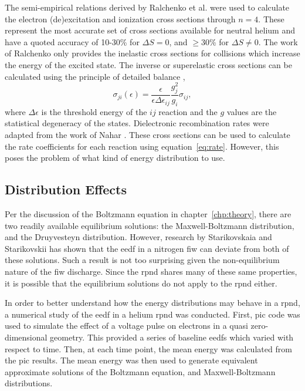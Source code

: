 The semi-empirical relations derived by Ralchenko et al. \cite{Ralchenko2008}
were used to calculate the electron (de)excitation and ionization cross sections
through $n=4$. These represent the most accurate set of cross sections available
for neutral helium and have a quoted accuracy of 10-30\% for $\Delta S=0$, and
$\ge30$\% for $\Delta S \neq 0$. The work of Ralchenko only provides the
inelastic cross sections for collisions which increase the energy of the excited
state. The inverse or superelastic cross sections can be calculated using the
principle of detailed balance \cite{Kunze2009},
\begin{equation}
  \sigma_{ji}(\epsilon) = \frac{\epsilon}{\epsilon\Delta\epsilon_{ij}}
    \frac{g_j^2}{g_i}\sigma_{ij},
\end{equation}
where $\Delta\epsilon$ is the threshold energy of the $ij$ reaction and the $g$
values are the statistical degeneracy of the states. Dielectronic recombination
rates were adapted from the work of Nahar \cite{Nahar2010}. These cross sections
can be used to calculate the rate coefficients for each reaction using
equation~\ref{eq:rate}. However, this poses the problem of what kind of energy
distribution to use.

\subsection{Distribution Effects}

Per the discussion of the Boltzmann equation in chapter~\ref{chp:theory}, there
are two readily available equilibrium solutions: the Maxwell-Boltzmann
distribution, and the Druyvesteyn distribution. However, research by
Starikovskaia and Starikovskii \cite{Starikovskaia2001} has shown that the
\acs{eedf} in a nitrogen \acs{fiw} can deviate from both of these solutions.
Such a result is not too surprising given the non-equilibrium nature of the
\acs{fiw} discharge. Since the \acs{rpnd} shares many of these same properties,
it is possible that the equilibrium solutions do not apply to the \acs{rpnd}
either.

In order to better understand how the energy distributions may behave in a
\acs{rpnd}, a numerical study of the \acs{eedf} in a helium \acs{rpnd} was
conducted. First, \acs{pic} code was used to simulate the effect of a voltage
pulse on electrons in a quasi zero-dimensional geometry. This provided a series
of baseline \acs{eedf}s which varied with respect to time. Then, at each time
point, the mean energy was calculated from the \acs{pic} results. The mean
energy was then used to generate equivalent approximate solutions of the
Boltzmann equation, and Maxwell-Boltzmann distributions.

